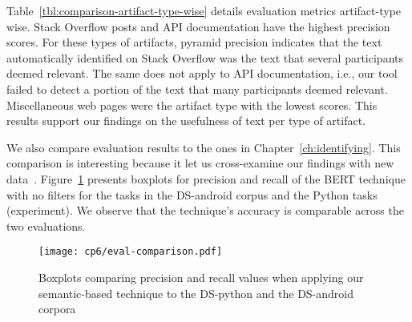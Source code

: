 



Table~\ref{tbl:comparison-artifact-type-wise} details evaluation metrics artifact-type wise. 
Stack Overflow posts and API documentation have the highest precision scores. For these types of artifacts, pyramid precision indicates that the 
text automatically identified on Stack Overflow was the text that several participants deemed relevant. 
The same does not apply to API documentation, i.e., our tool failed to detect a portion of the text that many participants deemed relevant. 
Miscellaneous web pages were the artifact type with the lowest scores. This results support our findings 
on the usefulness of text per type of artifact.





We also compare evaluation results to the ones in Chapter~\ref{ch:identifying}. 
This comparison is interesting because it let us cross-examine our findings with new data~\cite{easterbrook2008, Seaman1999}.
Figure~\ref{fig:eval-comparison} presents boxplots for precision and recall of the BERT technique with no filters 
for the tasks in the \acs{DS-android} corpus and the Python tasks (experiment). We observe that the technique's accuracy
is comparable across the two evaluations. 



\begin{figure}[h!]
    \centering
    \texttt{[image: cp6/eval-comparison.pdf]}
    \caption{Boxplots comparing precision and recall values when applying our semantic-based technique to the \acs{DS-python} and the \acs{DS-android} corpora}
    \label{fig:eval-comparison}
\end{figure}

